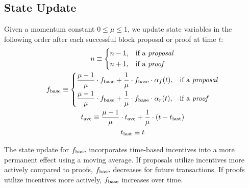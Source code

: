 \documentclass[9pt,oneside]{amsart}
\begin{document}
\begin{multicols}{2}
\subsection{State Update}
Given a momentum constant $ 0\leq \mu \leq 1$, we update state variables in the following order after each successful block proposal or proof at time $t$:
\begin{gather}
    n \equiv 
 \begin{dcases}
     n - 1, &\text{if a \emph{proposal}} \\
      n + 1, &\text{if a \emph{proof}}
\end{dcases}\\
f_\textnormal{base} \equiv 
 \begin{dcases}
     \frac{\mu-1}{\mu} \cdot f_\textnormal{base} + \frac{1}{\mu} \cdot f_\textnormal{base}\cdot \alpha_f(t), &\text{if a \emph{proposal}} \\
      \frac{\mu-1}{\mu} \cdot f_\textnormal{base} + \frac{1}{\mu} \cdot f_\textnormal{base} \cdot \alpha_r(t), &\text{if a \emph{proof}}
\end{dcases}
\\
t_\textnormal{ave} \equiv 
\frac{\mu-1}{\mu} \cdot t_\textnormal{ave} + \frac{1}{\mu} \cdot (t-t_\textnormal{last})
\\
t_\textnormal{last} \equiv t
\end{gather}


The state update for $f_\textnormal{base}$ incorporates time-based incentives into a more permanent effect using a moving average. If proposals utilize incentives more actively compared to proofs, $f_\textnormal{base}$ decreases for future transactions. If proofs utilize incentives more actively, $f_\textnormal{base}$ increases over time.




\end{multicols}
\end{document}
